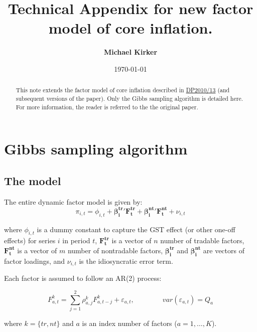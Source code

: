 \documentclass[11pt,english,a4paper]{article}
\begin{document}
\title{Technical Appendix for new factor model of core inflation.}
\date{\today}
\author{{\bf Michael Kirker}}

\maketitle



\begin{abstract}
This note extends the factor model of core inflation described in \href{http://rbnz.govt.nz/research/discusspapers/dp10_13.pdf}{DP2010/13} (and subsequent versions of the paper). Only the Gibbs sampling algorithm is detailed here. For more information, the reader is referred to the the original paper.
\end{abstract}




\section*{Gibbs sampling algorithm}\label{apdix:Gibbs}


\subsection*{The model}
The entire dynamic factor model is given by:
\begin{equation}\label{eq:model}
\pi_{i,t} = \phi_{i,t} + \boldsymbol{\beta^{tr}_{i}}' \mathbf{F^{tr}_{t}} +  \boldsymbol{\beta^{nt}_{i}}' \mathbf{F^{nt}_{t}} + \nu_{i,t}
\end{equation}

where $\phi_{i,t}$ is a dummy constant to capture the GST effect (or other one-off effects) for series $i$ in period $t$, $\mathbf{F^{tr}_{t}}$ is a vector of $n$ number of tradable factors, $\mathbf{F^{nt}_{t}}$ is a vector of $m$ number of nontradable factors, $\boldsymbol{\beta^{tr}_{i}}$ and $\boldsymbol{\beta^{nt}_{i}}$ are vectors of factor loadings, and $\nu_{i,t}$ is the idiosyncratic error term.

Each factor is assumed to follow an AR(2) process:

\begin{equation}\label{eq:ar2fact}
F^{k}_{a,t} = \sum^{2}_{j=1} \rho^{k}_{a,j} F^{k}_{a,t-j} + \varepsilon_{a,t},      \qquad \qquad var\left( \varepsilon_{a,t} \right) =Q_{a}
\end{equation}

where $k = \{tr,nt\}$ and $a$ is an index number of factors ($a=1,\ldots,K$).
\end{document}
